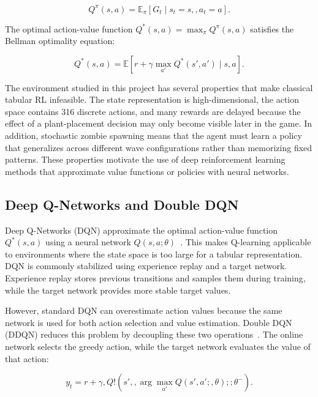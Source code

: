 \documentclass[conference,onecolumn]{IEEEtran}
\begin{document}
\begin{equation}
Q^\pi(s, a) = \mathbb{E}_\pi \left[ G_t \mid s_t = s,, a_t = a \right].
\end{equation}

The optimal action-value function $Q^*(s, a) = \max_\pi Q^\pi(s, a)$ satisfies the Bellman optimality equation:

\begin{equation}
Q^*(s, a) = \mathbb{E} \left[ r + \gamma \max_{a'} Q^*(s', a') \mid s, a \right].
\end{equation}

The environment studied in this project has several properties that make classical tabular RL infeasible. The state representation is high-dimensional, the action space contains 316 discrete actions, and many rewards are delayed because the effect of a plant-placement decision may only become visible later in the game. In addition, stochastic zombie spawning means that the agent must learn a policy that generalizes across different wave configurations rather than memorizing fixed patterns. These properties motivate the use of deep reinforcement learning methods that approximate value functions or policies with neural networks.

\subsection{Deep Q-Networks and Double DQN}

Deep Q-Networks (DQN) approximate the optimal action-value function $Q^*(s,a)$ using a neural network $Q(s,a;\theta)$~\cite{mnih2015humanlevel}. This makes Q-learning applicable to environments where the state space is too large for a tabular representation. DQN is commonly stabilized using experience replay and a target network. Experience replay stores previous transitions and samples them during training, while the target network provides more stable target values.

However, standard DQN can overestimate action values because the same network is used for both action selection and value estimation. Double DQN (DDQN) reduces this problem by decoupling these two operations~\cite{van2016deep}. The online network selects the greedy action, while the target network evaluates the value of that action:

\begin{equation}
y_t = r + \gamma, Q!\left(s',, \arg\max_{a'} Q(s', a';,\theta);; \theta^-\right).
\end{equation}
\end{document}
